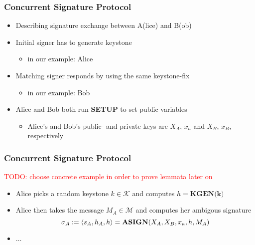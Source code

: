 \begin{frame}
	\frametitle{Concurrent Signature Protocol}

	\begin{itemize}
		\item Describing signature exchange between A(lice) and B(ob)
		\item Initial signer has to generate keystone
			\begin{itemize}
				\item in our example: Alice 
			\end{itemize}
		\item Matching signer responds by using the same keystone-fix
			\begin{itemize}
				\item in our example: Bob
			\end{itemize}
		\item Alice and Bob both run \textbf{SETUP} to set public variables
			\begin{itemize}
				\item Alice's and Bob's public- and private keys are $X_A$, $x_a$ and $X_B$, $x_B$, respectively
			\end{itemize}
	\end{itemize}
\end{frame}

\begin{frame}
	\frametitle{Concurrent Signature Protocol}

	\textcolor{red}{TODO: choose concrete example in order to prove lemmata later on}
	\begin{itemize}
		\item Alice picks a random keystone $k\in\mathcal{K}$ and computes $h = \textbf{KGEN(k)}$
		\item Alice then takes the message $M_A \in \mathcal{M}$ and computes her ambigous signature
			$$\sigma_A := \langle s_A,h_A,h \rangle = \textbf{ASIGN}(X_A, X_B, x_a, h, M_A)$$ %
		\item $\ldots$
	\end{itemize}
\end{frame}
